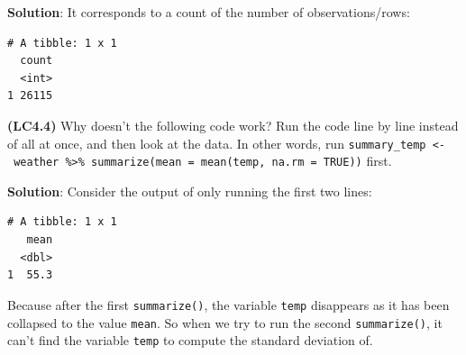 \documentclass[12pt, krantz2,]{krantz}
\makeatletter
\newenvironment{Shaded}{\begin{snugshade}}{\end{snugshade}}
\newcommand{\DataTypeTok}[1]{\textcolor[rgb]{0.27,0.27,0.27}{#1}}
\newcommand{\KeywordTok}[1]{\textcolor[rgb]{0.27,0.27,0.27}{\textbf{#1}}}
\newcommand{\NormalTok}[1]{#1}
\newcommand{\OperatorTok}[1]{\textcolor[rgb]{0.43,0.43,0.43}{\textbf{#1}}}
\newcommand{\OtherTok}[1]{\textcolor[rgb]{0.37,0.37,0.37}{#1}}
\newcommand{\StringTok}[1]{\textcolor[rgb]{0.5,0.5,0.5}{#1}}
\newenvironment{kframe}{%
\medskip{}
\setlength{\fboxsep}{.8em}
 \def\at@end@of@kframe{}%
 \ifinner\ifhmode%
  \def\at@end@of@kframe{\end{minipage}}%
  \begin{minipage}{\columnwidth}%
 \fi\fi%
 \def\FrameCommand##1{\hskip\@totalleftmargin \hskip-\fboxsep
 \colorbox{shadecolor}{##1}\hskip-\fboxsep
     \hskip-\linewidth \hskip-\@totalleftmargin \hskip\columnwidth}%
 \MakeFramed {\advance\hsize-\width
   \@totalleftmargin\z@ \linewidth\hsize
   \@setminipage}}%
 {\par\unskip\endMakeFramed%
 \at@end@of@kframe}
\renewenvironment{Shaded}{\begin{kframe}}{\end{kframe}}
\makeatother
\begin{document}
\textbf{Solution}: It corresponds to a count of the number of observations/rows:

\begin{Shaded}
\end{Shaded}

\begin{verbatim}
# A tibble: 1 x 1
  count
  <int>
1 26115
\end{verbatim}

\textbf{(LC4.4)} Why doesn't the following code work? Run the code line by line instead of all at once, and then look at the data. In other words, run \texttt{summary\_temp\ \textless{}-\ weather\ \%\textgreater{}\%\ summarize(mean\ =\ mean(temp,\ na.rm\ =\ TRUE))} first.

\begin{Shaded}
\end{Shaded}

\textbf{Solution}: Consider the output of only running the first two lines:

\begin{Shaded}
\end{Shaded}

\begin{verbatim}
# A tibble: 1 x 1
   mean
  <dbl>
1  55.3
\end{verbatim}

Because after the first \texttt{summarize()}, the variable \texttt{temp} disappears as it has been collapsed to the value \texttt{mean}. So when we try to run the second \texttt{summarize()}, it can't find the variable \texttt{temp} to compute the standard deviation of.
\end{document}
